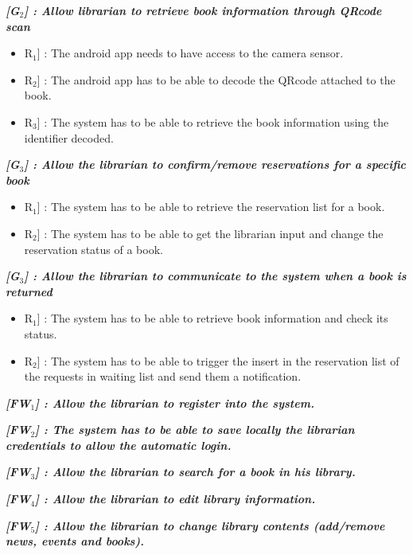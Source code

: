 \vspace{0.5cm}
\noindent
\emph{\textbf{[G$_{2}$] : Allow librarian to retrieve book information through QRcode scan}}
\begin{itemize}
	\setlength{\leftskip}{0.5cm}
	\item \lbrack R$_{1}$] : The android app needs to have access to the camera sensor.
	\item \lbrack R$_{2}$] : The android app has to be able to decode the QRcode attached to the book.
	\item \lbrack R$_{3}$] : The system has to be able to retrieve the book information using the identifier decoded.
\end{itemize}

\vspace{0.5cm}
\noindent
\emph{\textbf{[G$_{3}$] : Allow the librarian to confirm/remove reservations for a specific book}}
\begin{itemize}
	\setlength{\leftskip}{0.5cm}
	\item \lbrack R$_{1}$] : The system has to be able to retrieve the reservation list for a book.
	\item \lbrack R$_{2}$] : The system has to be able to get the librarian input and change the reservation status of a book.
\end{itemize}

\vspace{0.5cm}
\noindent
\emph{\textbf{[G$_{3}$] : Allow the librarian to communicate to the system when a book is returned}}
\begin{itemize}
	\setlength{\leftskip}{0.5cm}
	\item \lbrack R$_{1}$] : The system has to be able to retrieve book information and check its status.
	\item \lbrack R$_{2}$] : The system has to be able to trigger the insert in the reservation list of the requests in waiting list and send them a notification.
\end{itemize}

\vspace{0.5cm}
\noindent
\emph{\textbf{[FW$_{1}$] : Allow the librarian to register into the system.}}

\vspace{0.5cm}
\noindent
\emph{\textbf{[FW$_{2}$] : The system has to be able to save locally the librarian credentials to allow the automatic login.}}

\vspace{0.5cm}
\noindent
\emph{\textbf{[FW$_{3}$] : Allow the librarian to search for a book in his library.}}

\vspace{0.5cm}
\noindent
\emph{\textbf{[FW$_{4}$] : Allow the librarian to edit library information.}}

\vspace{0.5cm}
\noindent
\emph{\textbf{[FW$_{5}$] : Allow the librarian to change library contents (add/remove news, events and books).}}








